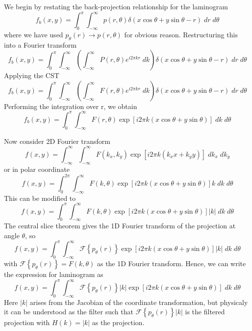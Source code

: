 \documentclass[../../../main.tex]{subfiles}
\begin{document}
We begin by restating the back-projection relationship for the laminogram
\begin{equation*}
    f_b(x,y)=\int_{0 }^{\pi}\int_{-\infty}^{\infty} p(r,\theta)\delta(x\cos\theta+y\sin\theta -r)\;dr\;d\theta
\end{equation*}
where we have used $p_\theta(r)\rightarrow p(r,\theta)$ for obvious reason.
Restructuring this into a Fourier transform
\begin{equation*}
    f_b(x,y)=\int_{0 }^{\pi}\int_{-\infty}^{\infty} \left(\int_{-\infty}^{\infty} P(r,\theta)e^{i2\pi kr}\;dk\right)\delta(x\cos\theta+y\sin\theta -r)\;dr\;d\theta
\end{equation*}
Applying the CST
\begin{equation*}
    f_b(x,y)=\int_{0 }^{\pi}\int_{-\infty}^{\infty} \left(\int_{-\infty}^{\infty} F(r,\theta)e^{i2\pi kr}\;dk\right)\delta(x\cos\theta+y\sin\theta -r)\;dr\;d\theta
\end{equation*}
Performing the integration over r, we obtain
\begin{equation*}
    f_b(x,y)=\int_{0 }^{\pi}\int_{-\infty}^{\infty} F(r,\theta)\exp \left[ i2 \pi k \left( x \cos \theta+ y \sin \theta \right)  \right] \;dk\;d\theta
\end{equation*}

Now consider 2D Fourier transform
\begin{equation*}
    f(x,y) = \int_{-\infty }^{\infty}\int_{-\infty }^{\infty}F(k_x,k_y)\exp \left[{i 2\pi k (k_x x + k_y y)}\right]\; dk_x \; dk_y
\end{equation*}
or in polar coordinate
\begin{equation*}
    f(x,y) = \int_{0 }^{2\pi}\int_{-\infty }^{\infty}F(k,\theta) \exp \left[{i 2\pi k (x\cos\theta + y\sin\theta)}\right] k \; dk \; d\theta
\end{equation*}
This can be modified to
\begin{equation*}
    f(x,y) = \int_{0 }^{\pi}\int_{-\infty }^{\infty}F(k,\theta) \exp \left[{i 2\pi k (x\cos\theta + y\sin\theta)}\right] |k| \; dk \; d\theta
\end{equation*}
The central slice theorem gives the 1D Fourier transform of the projection at angle $\theta$, so
\begin{equation*}
    f(x,y) = \int_{0 }^{\pi}\int_{-\infty }^{\infty}\mathcal{F} \left\{ p_\theta(r) \right\}  \exp \left[{i 2\pi k (x\cos\theta + y\sin\theta)}\right] |k| \; dk \; d\theta
\end{equation*}
with $\mathcal{F} \left\{ p_\theta(r) \right\}=F(k,\theta)$ as the 1D Fourier transform.
Hence, we can write the expression for laminogram as
\begin{equation*}
    f(x,y) = \int_{0}^{\pi}\int_{-\infty }^{\infty}\mathcal{F} \left\{ p_\theta(r) \right\} |k| \exp \left[{i 2\pi k (x\cos\theta + y\sin\theta)}\right] \; dk \; d\theta
\end{equation*}
Here $|k|$ arises from the Jacobian of the coordinate transformation, but physicaly it can be understood as the filter such that $\mathcal{F} \left\{ p_\theta(r) \right\} |k|$ is the filtered projection with $H(k)=|k|$ as the projection.
\end{document}
